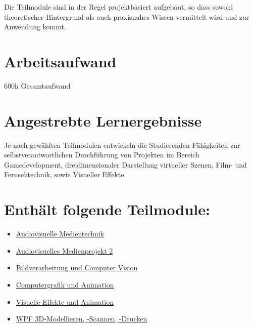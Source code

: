 Die Teilmodule sind in der Regel projektbasiert aufgebaut, so dass
sowohl theoretischer Hintergrund als auch praxisnahes Wissen vermittelt
wird und zur Anwendung kommt.

\hypertarget{arbeitsaufwandpathlabelmi-2017modulbeschreibungen-bachelorba_vertiefung-visual-computing}{%
\section*{Arbeitsaufwand\label{/mi-2017/modulbeschreibungen-bachelor/BA_Vertiefung-Visual-Computing}}\label{arbeitsaufwandpathlabelmi-2017modulbeschreibungen-bachelorba_vertiefung-visual-computing}}

600h Gesamtaufwand

\hypertarget{angestrebte-lernergebnissepathlabelmi-2017modulbeschreibungen-bachelorba_vertiefung-visual-computing}{%
\section*{Angestrebte
Lernergebnisse\label{/mi-2017/modulbeschreibungen-bachelor/BA_Vertiefung-Visual-Computing}}\label{angestrebte-lernergebnissepathlabelmi-2017modulbeschreibungen-bachelorba_vertiefung-visual-computing}}

Je nach gewählten Teilmodulen entwickeln die Studierenden Fähigkeiten
zur selbstverantwortlichen Durchführung von Projekten im Bereich
Gamedevelopment, dreidimensionaler Darstellung virtueller Szenen, Film-
und Fernsehtechnik, sowie Visueller Effekte.

\hypertarget{enthuxe4lt-folgende-teilmodulepathlabelmi-2017modulbeschreibungen-bachelorba_vertiefung-visual-computing}{%
\section*{Enthält folgende
Teilmodule:\label{/mi-2017/modulbeschreibungen-bachelor/BA_Vertiefung-Visual-Computing}}\label{enthuxe4lt-folgende-teilmodulepathlabelmi-2017modulbeschreibungen-bachelorba_vertiefung-visual-computing}}

\begin{itemize}
\tightlist
\item
  \hyperref[/mi-2017/modulbeschreibungen-bachelor/BA_VC-audiovisuelle-medientechnik]{Audiovisuelle Medientechnik}
\item
  \hyperref[/mi-2017/modulbeschreibungen-bachelor/BA_VC-audiovisuelles-medienprojekt-2]{Audiovisuelles Medienprojekt 2}
\item
  \hyperref[/mi-2017/modulbeschreibungen-bachelor/BA_VC-bildverarbeitung-und-computer-vision]{Bildverarbeitung und Computer Vision}
\item
  \hyperref[/mi-2017/modulbeschreibungen-bachelor/BA_VC-computergrafik-und-animation]{Computergrafik und Animation}
\item
  \hyperref[/mi-2017/modulbeschreibungen-bachelor/BA_VC-visuelle-effekte-und-animation]{Visuelle Effekte und Animation}
\item
  \hyperref[/mi-2017/modulbeschreibungen-bachelor/BA_WPF-3D-MSD]{WPF 3D-Modellieren, -Scannen, -Drucken}
\end{itemize}

